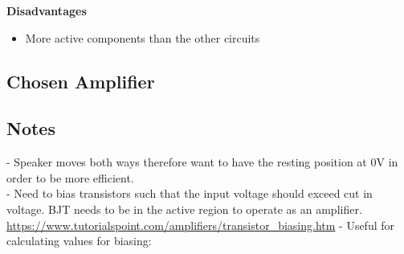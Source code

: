 \documentclass[12pt, a4paper]{article}
\begin{document}
	\textbf{Disadvantages}
	\begin{itemize}
		\item More active components than the other circuits
	\end{itemize}
	
	\pagebreak
	\subsection{Chosen Amplifier}
	
	\subsection*{Notes}
	 - Speaker moves both ways therefore want to have the resting position at 0V in order to be more efficient. \\
	 - Need to bias transistors such that the input voltage should exceed cut in voltage. BJT needs to be in the active region to operate as an amplifier. \url{https://www.tutorialspoint.com/amplifiers/transistor_biasing.htm}
	 - Useful for calculating values for biasing: \cite{classAbiasing}
	
	\printbibliography[title={References}]
		
\end{document}
